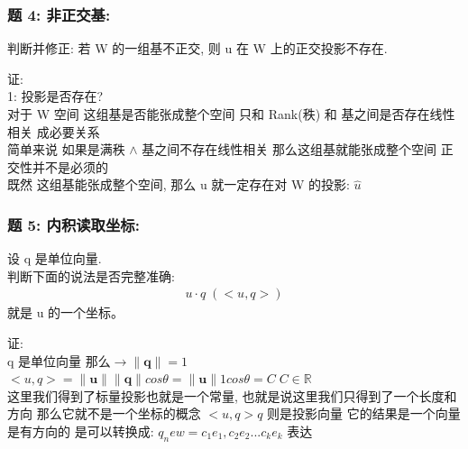 \documentclass[12pt]{article}
\begin{document}
\begin{flushleft}
    \subsubsection{题 4: 非正交基:}
    判断并修正: 若 W 的一组基不正交, 则 u 在 W 上的正交投影不存在.

    证: \\
    1: 投影是否存在? \\
    对于 W 空间 这组基是否能张成整个空间 只和 Rank(秩) 和 基之间是否存在线性相关 成必要关系 \\
    简单来说 如果是满秩 $\land$ 基之间不存在线性相关 那么这组基就能张成整个空间 正交性并不是必须的 \\
    既然 这组基能张成整个空间, 那么 u 就一定存在对 W 的投影:  $\hat{u}$ \\

\end{flushleft}



\begin{flushleft}
    \subsubsection{题 5: 内积读取坐标:}
    设 q 是单位向量. \\
    判断下面的说法是否完整准确: \\
    \begin{align}
        u \cdot q \;(<u,q>)
    \end{align}
    就是 u 的一个坐标。

    证: \\
    q 是单位向量 那么$\rightarrow \| \boldsymbol q \| = 1$ \\
    $<u,q> = \| \boldsymbol u \| \| \boldsymbol q \| cos\theta = \| \boldsymbol u \| 1 cos\theta = C \; {C \in \mathbb{R}}$ \\
    这里我们得到了标量投影也就是一个常量, 也就是说这里我们只得到了一个长度和方向 那么它就不是一个坐标的概念
    $<u,q>q$ 则是投影向量 它的结果是一个向量 是有方向的 是可以转换成: $q_new = c_{1}e_{1}, c_{2}e_{2} ...c_{k}e_{k}$ 表达

\end{flushleft}
\end{document}
